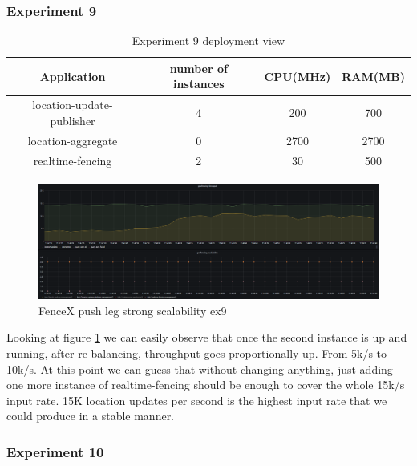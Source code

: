 \documentclass[a4]{report}
\begin{document}
    \clearpage

    \subsubsection{Experiment 9}
    \begin{table}[h!]
        \centering
        \begin{tabular}{|c|c|c|c|}
            \hline
            Application               & number of instances & CPU(MHz) & RAM(MB) \\
            \hline
            location-update-publisher & 4                   & 200      & 700     \\
            location-aggregate        & 0                   & 2700     & 2700    \\
            realtime-fencing          & 2                   & 30       & 500     \\
            \hline
        \end{tabular}
        \caption{Experiment 9 deployment view}
        \label{table:ex9-dv}
    \end{table}

    \begin{figure}[h!]
        \caption{FenceX push leg strong scalability ex9}
        \label{fig:ex9}
        \includegraphics[scale=0.4]{images/evaluation/ex9-benchmarking-ongoing-2per4sec.png}
    \end{figure}

    Looking at figure \ref{fig:ex9} we can easily observe that once the second instance is up and running, after
    re-balancing, throughput goes proportionally up.
    From 5k/s to 10k/s.
    At this point we can guess that without changing anything, just adding one more instance of realtime-fencing
    should be enough to cover the whole 15k/s input rate.
    15K location updates per second is the highest input rate that we could produce in a stable manner.

    \clearpage

    \subsubsection{Experiment 10}
\end{document}
